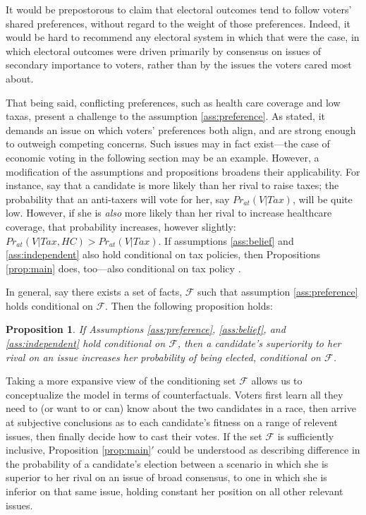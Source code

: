 \documentclass[11pt]{article}
\newtheorem{prop}{Proposition}
\newenvironment{propbis}[1]
  {\renewcommand{\theprop}{\ref{#1}$'$}%
   \addtocounter{prop}{-1}%
   \begin{prop}}
  {\end{prop}}
\begin{document}
It would be prepostorous to claim that electoral outcomes tend
to follow voters' shared preferences, without regard to the weight of
those preferences.
Indeed, it would be hard to recommend any electoral system in which
that were the case, in which electoral outcomes were driven primarily by
consensus on issues of secondary importance to voters, rather than by
the issues the voters cared most about. 

That being said, conflicting preferences, such as health care coverage
and low taxas, present a challenge to the assumption
\ref{ass:preference}.
As stated, it demands an issue on which voters' preferences both
align, and are strong enough to outweigh competing concerns.
Such issues may in fact exist---the case of economic voting in the
following section may be an example.
However, a modification of the assumptions and propositions
broadens their applicability. 
For instance, say that a candidate is more likely than her rival to
raise taxes; the probability that an anti-taxers will vote for her,
say $Pr_{at}(V|Tax)$, will be quite low.
However, if she is \emph{also} more likely than her rival to increase
healthcare coverage, that probability increases, however slightly:
$Pr_{at}(V|Tax,HC)>Pr_{at}(V|Tax)$. 
If assumptions \ref{ass:belief} and \ref{ass:independent} also hold
conditional on tax policies, then Propositions \ref{prop:main} does,
too---also conditional on tax policy  \citep[see][for a similar argument]{dietrich2013epistemic}.

In general, say there exists a set of facts, $\mathcal{F}$ such that
assumption \ref{ass:preference} holds conditional on $\mathcal{F}$.
Then the following proposition holds:
\begin{propbis}{prop:main}\label{prop:mainPrime}
If Assumptions \ref{ass:preference}, \ref{ass:belief}, and
\ref{ass:independent} hold conditional on $\mathcal{F}$, then
a candidate's superiority to her rival on an issue increases her
probability of being elected, conditional on $\mathcal{F}$.
\end{propbis}

Taking a more expansive view of the conditioning set $\mathcal{F}$
allows us to conceptualize the model in terms of counterfactuals. 
Voters first learn all they need to (or want to or can) know about the two
candidates in a race, then arrive at subjective conclusions as to each
candidate's fitness on a range of relevent issues, then finally decide
how to cast their votes. 
If the set $\mathcal{F}$ is sufficiently inclusive, Proposition
\ref{prop:main}$'$ could be understood as describing difference in the
probability of a candidate's election between a scenario in which she
is superior to her rival on an issue of broad consensus, to one in
which she is inferior on that same issue, holding constant her
position on all other relevant issues. 
\end{document}
